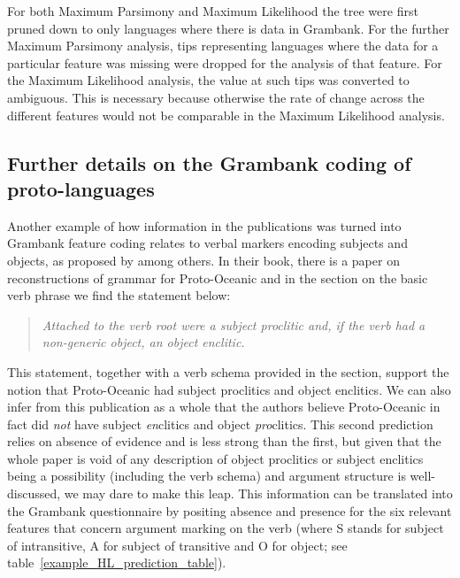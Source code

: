 \documentclass[a4paper,10pt]{article} %
\begin{document}
For both Maximum Parsimony and Maximum Likelihood the tree were first pruned down to only languages where there is data in Grambank. For the further Maximum Parsimony analysis, tips representing languages where the data for a particular feature was missing were dropped for the analysis of that feature. For the Maximum Likelihood analysis, the value at such tips was converted to ambiguous. This is necessary because otherwise the rate of change across the different features would not be comparable in the Maximum Likelihood analysis.

\subsection{Further details on the Grambank coding of proto-languages }
\label{supp:proto_lg_coding}
Another example of how information in the publications was turned into Grambank feature coding relates to verbal markers encoding subjects and objects, as proposed by \citet{lynchrosscrowley_proto_grammar_oceanic} among others. In their book, there is a paper on reconstructions of grammar for Proto-Oceanic and in the section on the basic verb phrase we find the statement below:

\begin{quotation}
\noindent\emph{Attached to the verb root were a subject proclitic and, if the verb had a non-generic object, an object enclitic.} \end{quotation} \begin{flushright} \citet[83]{lynchrosscrowley_proto_grammar_oceanic} \end{flushright}

This statement, together with a verb schema provided in the section, support the notion that Proto-Oceanic had subject proclitics and object enclitics. We can also infer from this publication as a whole that the authors believe Proto-Oceanic in fact did \emph{not} have subject \emph{en}clitics and object \emph{pro}clitics. This second prediction relies on absence of evidence and is less strong than the first, but given that the whole paper is void of any description of object proclitics or subject enclitics being a possibility (including the verb schema) and argument structure is well-discussed, we may dare to make this leap. This information can be translated into the Grambank questionnaire by positing absence and presence for the six relevant features that concern argument marking on the verb (where S stands for subject of intransitive, A for subject of transitive and O for object; see table~\ref{example_HL_prediction_table}).
\end{document}
